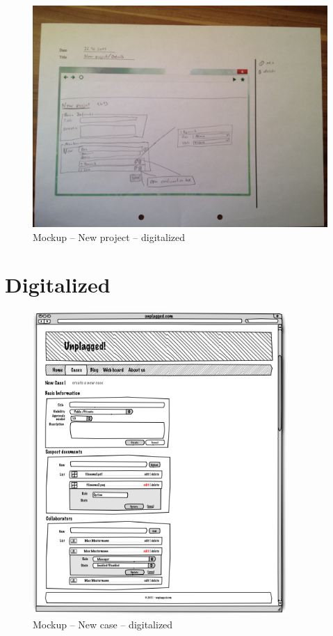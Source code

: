 \begin{appendix}
\begin{figure}[!h]
  \centering
    \includegraphics[width=\textwidth]{mockups/m_new_project.jpg}
  \caption{Mockup – New project – digitalized }
  \label{fig:mNewProjectMockup}
\end{figure}

\clearpage
\section{Digitalized}

\begin{figure}[htbp]
  \centering
    \includegraphics[width=0.86\textwidth]{mockups/1_new_case.png}
  \caption{Mockup – New case – digitalized }
  \label{fig:1newCaseMockup}
\end{figure}


\end{appendix}
